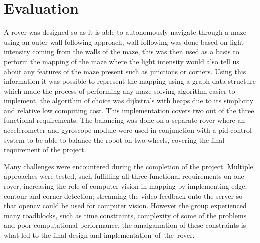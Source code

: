 \section{Evaluation}
A rover was designed so as it is able to autonomously navigate through a maze using an outer wall following approach, wall following was done based on light intensity coming from the walls of the maze, this was then used as a basis to perform the mapping of the maze where the light intensity would also tell us about any features of the maze present such as junctions or corners. Using this information it was possible to represent the mapping using a graph data structure which made the process of performing any maze solving algorithm easier to implement, the algorithm of choice was dijkstra’s with heaps due to its simplicity and relative low computing cost. This implementation covers two out of the three functional requirements. The balancing was done on a separate rover where an accelerometer and gyroscope module were used in conjunction with a pid control system to be able to balance the robot on two wheels, covering the final requirement of the project.

Many challenges were encountered during the completion of the project. Multiple approaches were tested, such fulfilling all three functional requirements on one rover, increasing the role of computer vision in mapping by implementing edge, contour and corner detection; streaming the video feedback onto the server so that opencv could be used for computer vision. However the group experienced many roadblocks, such as time constraints, complexity of some of the problems and poor computational performance, the amalgamation of these constraints is what led to the final design and implementation of the rover.